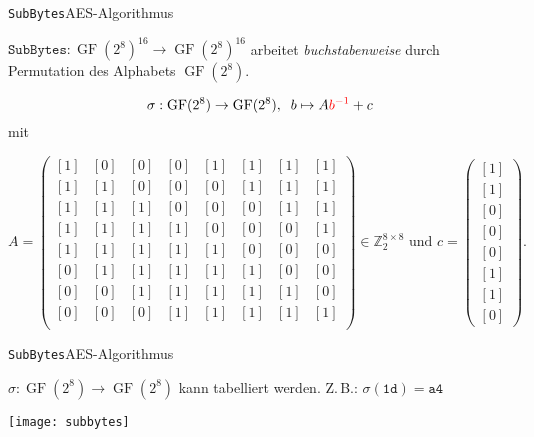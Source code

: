 \documentclass{beamer}
\newcommand{\Z}{\mathbb{Z}}
\newcommand{\tred}[1]{{\textcolor{red}{#1}}}
\newcommand{\GF}{\operatorname{GF}}
\newcommand{\ol}[1]{[#1]}
\theoremstyle{plain}
\begin{document}
\begin{frame}{\texttt{SubBytes}}{AES-Algorithmus}

\begin{block}{}$\texttt{SubBytes}: \GF(2^8)^{16} \rightarrow \GF(2^8)^{16}$ arbeitet \emph{buchstabenweise} durch Permutation des Alphabets $\GF(2^8)$.\end{block}

\begin{small}
 \[\sigma: \GF(2^8) \rightarrow \GF(2^8), \;\; b \mapsto A \tred{b^{-1}} + c\]
mit

\[A = \begin{pmatrix}
   \ol 1 & \ol 0 & \ol 0 & \ol 0 & \ol 1 & \ol 1 & \ol 1& \ol 1 \\
   \ol 1 & \ol 1 & \ol 0 & \ol 0 & \ol 0 & \ol 1 & \ol 1& \ol 1 \\
   \ol 1 & \ol 1 & \ol 1 & \ol 0 & \ol 0 & \ol 0 & \ol 1& \ol 1 \\
   \ol 1 & \ol 1 & \ol 1 & \ol 1 & \ol 0 & \ol 0 & \ol 0& \ol 1 \\
   \ol 1 & \ol 1 & \ol 1 & \ol 1 & \ol 1 & \ol 0 & \ol 0& \ol 0 \\
   \ol 0 & \ol 1 & \ol 1 & \ol 1 & \ol 1 & \ol 1 & \ol 0& \ol 0 \\
   \ol 0 & \ol 0 & \ol 1 & \ol 1 & \ol 1 & \ol 1 & \ol 1& \ol 0 \\
   \ol 0 & \ol 0 & \ol 0 & \ol 1 & \ol 1 & \ol 1 & \ol 1& \ol 1 \\
  \end{pmatrix} \in \Z_2^{8\times8} \text{ und } c = \begin{pmatrix}
							\ol 1 \\
							\ol 1 \\
							\ol 0 \\
							\ol 0 \\
							\ol 0 \\
							\ol 1 \\
							\ol 1 \\
							\ol 0
						      \end{pmatrix}.\]
\end{small}
\end{frame}

\begin{frame}{\texttt{SubBytes}}{AES-Algorithmus}
\begin{block}{}
 $\sigma: \GF(2^8) \rightarrow \GF(2^8)$ kann tabelliert werden. Z.\,B.:  $\sigma(\texttt{1d}) = \texttt{a4}$
\end{block}
\begin{center}
\texttt{[image: subbytes]}
\end{center}
\end{frame}
\end{document}
